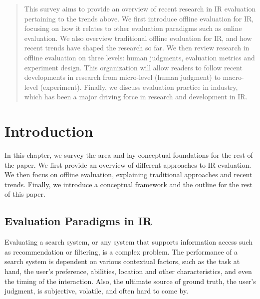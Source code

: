 \documentclass[openany]{now} %
\newcommand{\authornote}[3]{\marginpar{\tiny\color{#1}#2: #3}{\color{#1}{$\star$}}}
\newcommand{\emine}[1]{\authornote{green}{Emine}{#1}}
\newcommand{\paul}[1]{\authornote{blue}{Paul}{#1}}
\begin{document}
\begin{abstract}
This survey aims to provide an overview of recent research in IR evaluation pertaining to the trends above. We first introduce offline evaluation for IR, focusing on how it relates to other evaluation paradigms such as online evaluation. We also overview traditional offline evaluation for IR, and how recent trends have shaped the research so far. We then review research in offline evaluation on three levels: human judgments, evaluation metrics and experiment design. This organization will allow readers to follow recent developments in research from micro-level (human judgment) to macro-level (experiment). Finally, we discuss evaluation practice in industry, which has been a major driving force in research and development in IR.

\end{abstract}


\chapter{Introduction}
\label{c-intro}

In this chapter, we survey the area and lay conceptual foundations for the rest of the paper. We first provide an overview of different approaches to IR evaluation. We then focus on offline evaluation, explaining traditional approaches and recent trends. Finally, we introduce a conceptual framework and the outline for the rest of this paper.

\section{Evaluation Paradigms in IR}
\label{sec:evaluation-paradigms}

Evaluating a search system, or any system that supports information access such as recommendation or filtering, is a complex problem. The performance of a search system is dependent on various contextual factors, such as the task at hand, the user's preference, abilities, location and other characteristics, and even the timing of the interaction. Also, the ultimate source of ground truth, the user's judgment, is subjective, volatile, and often hard to come by.
\end{document}
